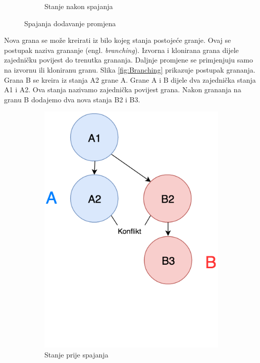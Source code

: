 \documentclass[times, utf8, diplomski, numeric]{fer}
\newcommand{\eng}[1]{(engl. \textit{#1})}
\begin{document}
\begin{figure}
\begin{subfigure}{.49\textwidth}
\caption{Stanje nakon spajanja}
\label{fig:FastForwardB}
\end{subfigure}
\caption{Spajanja dodavanje promjena}
\label{fig:FastForward}
\end{figure}

Nova grana se može kreirati iz bilo kojeg stanja postojeće granje. Ovaj se postupak naziva grananje \eng{branching}. Izvorna i klonirana grana dijele zajedničku povijest do trenutka grananja. Daljnje promjene se primjenjuju samo na izvornu ili kloniranu granu. Slika \ref{fig:Branching} prikazuje postupak grananja. Grana B se kreira iz stanja A2 grane A. Grane A i B dijele dva zajednička stanja A1 i A2. Ova stanja nazivamo zajednička povijest grana. Nakon grananja na granu B dodajemo dva nova stanja B2 i B3.


\begin{figure}[b!]
\centering
\begin{subfigure}{.49\textwidth}
\centering
\includegraphics[scale=0.6]{ConflictA}
\caption{Stanje prije spajanja}
\label{fig:ConflictA}
\end{subfigure}
\begin{subfigure}{.49\textwidth}

\end{subfigure}
\end{figure}
\end{document}
